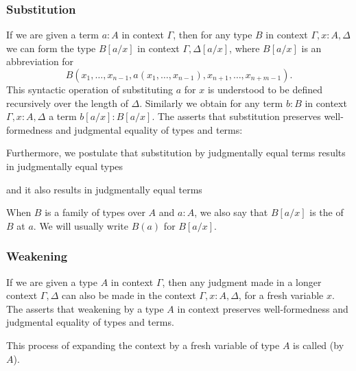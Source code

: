 \subsubsection*{Substitution}
If we are given a term $a:A$ in context $\Gamma$, then for any type $B$ in context $\Gamma,x:A,\Delta$ we can form the type $B[a/x]$ in context $\Gamma,\Delta[a/x]$, where $B[a/x]$ is an abbreviation for
\begin{equation*}
B(x_1,\ldots,x_{n-1},a(x_1,\ldots,x_{n-1}),x_{n+1},\ldots,x_{n+m-1}).
\end{equation*}
This syntactic operation of substituting $a$ for $x$ is understood to be defined recursively over the length of $\Delta$. Similarly we obtain for any term $b:B$ in context $\Gamma,x:A,\Delta$ a term $b[a/x]:B[a/x]$. The  asserts that substitution preserves well-formedness and judgmental equality of types and terms:
\begin{prooftree}
\end{prooftree}
Furthermore, we postulate that substitution by judgmentally equal terms results in judgmentally equal types
\begin{prooftree}
\end{prooftree}
and it also results in judgmentally equal terms
\begin{prooftree}
\end{prooftree}
When $B$ is a family of types over $A$ and $a:A$, we also say that $B[a/x]$ is the  of $B$ at $a$. We will usually write $B(a)$ for $B[a/x]$.

\subsubsection*{Weakening}
If we are given a type $A$ in context $\Gamma$, then any judgment made in a longer context $\Gamma,\Delta$ can also be made in the context $\Gamma,x:A,\Delta$, for a fresh variable $x$. The  asserts that weakening by a type $A$ in context preserves well-formedness and judgmental equality of types and terms.
\begin{prooftree}
\end{prooftree}
This process of expanding the context by a fresh variable of type $A$ is called  (by $A$).

